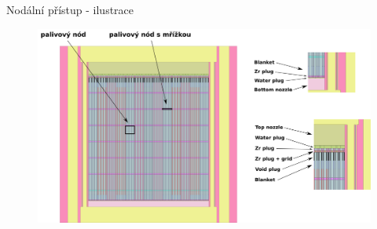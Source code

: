 \documentclass{beamer}
\begin{document}


\begin{frame}{Nodální přístup - ilustrace}
\begin{figure}
	\centering
	\includegraphics[scale=0.35]{img/reactor_axial_schema.png}
\end{figure}
\end{frame}
\end{document}

